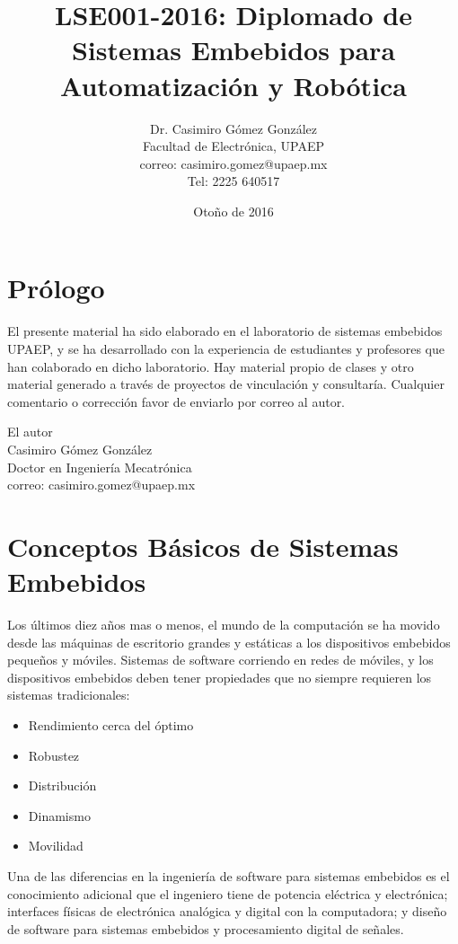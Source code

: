 \documentclass[12pt,twoside]{book}
\title{LSE001-2016: Diplomado de Sistemas Embebidos para Automatización y Robótica}
\author{Dr. Casimiro Gómez González\\
	Facultad de Electrónica, UPAEP\\
               correo: casimiro.gomez@upaep.mx\\
               Tel: 2225 640517}
\date{Otoño de 2016}
\begin{document}
\maketitle

\chapter*{Prólogo}

El presente material ha sido elaborado en el laboratorio de sistemas embebidos UPAEP, y se ha desarrollado con la experiencia de estudiantes y profesores que han colaborado en dicho laboratorio. Hay material propio de clases y otro material generado a través de proyectos de vinculación y consultaría. Cualquier comentario o corrección favor de enviarlo por correo al autor.

\begin{flushright}
	
	El autor\\
	Casimiro Gómez González\\
	Doctor en Ingeniería Mecatrónica \\
	correo: casimiro.gomez@upaep.mx
\end{flushright}

\tableofcontents


\chapter{Conceptos Básicos de Sistemas Embebidos}

Los últimos diez años mas o menos, el mundo de la computación se ha movido desde las máquinas de escritorio grandes y estáticas a los dispositivos embebidos pequeños y móviles. Sistemas de software corriendo en redes de móviles, y los dispositivos embebidos deben tener propiedades que no siempre requieren los sistemas tradicionales:
\begin{itemize}
	\item Rendimiento cerca del óptimo
	\item Robustez
	\item Distribución
	\item Dinamismo
	\item Movilidad
\end{itemize}

Una de las diferencias en la ingeniería de software para sistemas embebidos es el conocimiento adicional que el ingeniero tiene de potencia eléctrica y electrónica; interfaces físicas de electrónica analógica y digital con la computadora; y diseño de software para sistemas embebidos y procesamiento digital de señales.
\end{document}
